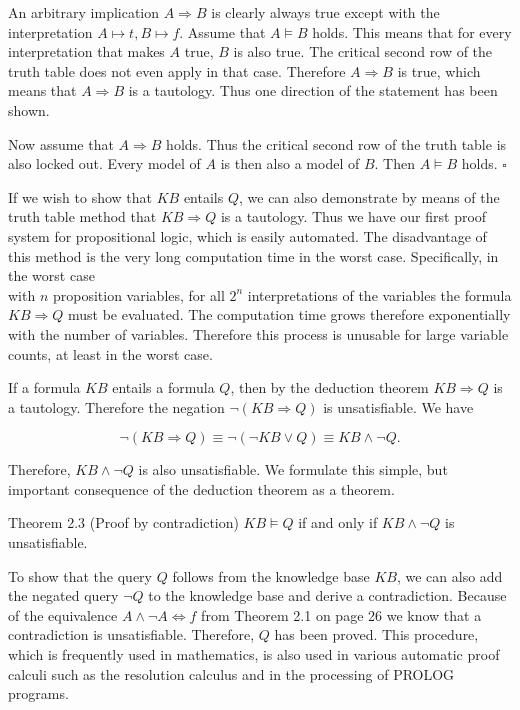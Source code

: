 \documentclass[10pt]{book}
\begin{document}
An arbitrary implication $A \Rightarrow B$ is clearly always true except with the interpretation $A \longmapsto t, B \longmapsto f$. Assume that $A \models B$ holds. This means that for every interpretation that makes $A$ true, $B$ is also true. The critical second row of the truth table does not even apply in that case. Therefore $A \Rightarrow B$ is true, which means that $A \Rightarrow B$ is a tautology. Thus one direction of the statement has been shown.

Now assume that $A \Rightarrow B$ holds. Thus the critical second row of the truth table is also locked out. Every model of $A$ is then also a model of $B$. Then $A \models B$ holds. \(\square\)

If we wish to show that $K B$ entails $Q$, we can also demonstrate by means of the truth table method that $K B \Rightarrow Q$ is a tautology. Thus we have our first proof system for propositional logic, which is easily automated. The disadvantage of this method is the very long computation time in the worst case. Specifically, in the worst case\\
with $n$ proposition variables, for all $2^{n}$ interpretations of the variables the formula $K B \Rightarrow Q$ must be evaluated. The computation time grows therefore exponentially with the number of variables. Therefore this process is unusable for large variable counts, at least in the worst case.


If a formula $K B$ entails a formula $Q$, then by the deduction theorem $K B \Rightarrow Q$ is a tautology. Therefore the negation $\neg(K B \Rightarrow Q)$ is unsatisfiable. We have

$$
\neg(K B \Rightarrow Q) \equiv \neg(\neg K B \vee Q) \equiv K B \wedge \neg Q .
$$

Therefore, $K B \wedge \neg Q$ is also unsatisfiable. We formulate this simple, but important consequence of the deduction theorem as a theorem.

Theorem 2.3 (Proof by contradiction) $K B \models Q$ if and only if $K B \wedge \neg Q$ is unsatisfiable.

To show that the query $Q$ follows from the knowledge base $K B$, we can also add the negated query $\neg Q$ to the knowledge base and derive a contradiction. Because of the equivalence $A \wedge \neg A \Leftrightarrow f$ from Theorem 2.1 on page 26 we know that a contradiction is unsatisfiable. Therefore, $Q$ has been proved. This procedure, which is frequently used in mathematics, is also used in various automatic proof calculi such as the resolution calculus and in the processing of PROLOG programs.
\end{document}
